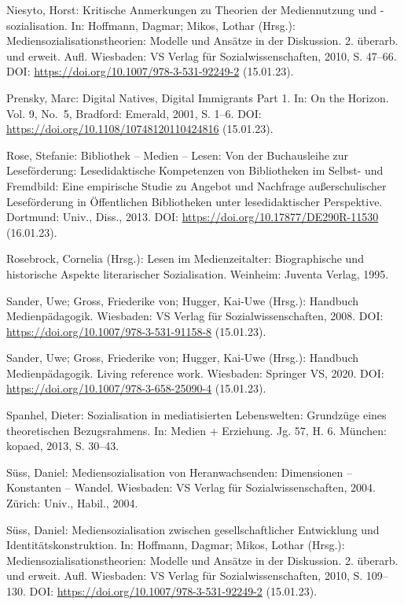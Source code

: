 \documentclass[a4paper,
fontsize=11pt,
oneside,
numbers=noperiodatend,
parskip=half-,
bibliography=totoc,
final
]{scrartcl}
\begin{document}
Niesyto, Horst: Kritische Anmerkungen zu Theorien der Mediennutzung und
-sozialisation. In: Hoffmann, Dagmar; Mikos, Lothar (Hrsg.):
Mediensozialisationstheorien: Modelle und Ansätze in der Diskussion. 2.
überarb. und erweit. Aufl. Wiesbaden: VS Verlag für
Sozialwissenschaften, 2010, S. 47--66. DOI:
\url{https://doi.org/10.1007/978-3-531-92249-2} (15.01.23).

Prensky, Marc: Digital Natives, Digital Immigrants Part 1. In: On the
Horizon. Vol. 9, No.~5, Bradford: Emerald, 2001, S. 1--6. DOI:
\url{https://doi.org/10.1108/10748120110424816} (15.01.23).

Rose, Stefanie: Bibliothek -- Medien -- Lesen: Von der Buchausleihe zur
Leseförderung: Lesedidaktische Kompetenzen von Bibliotheken im Selbst-
und Fremdbild: Eine empirische Studie zu Angebot und Nachfrage
außerschulischer Leseförderung in Öffentlichen Bibliotheken unter
lesedidaktischer Perspektive. Dortmund: Univ., Diss., 2013. DOI:
\url{https://doi.org/10.17877/DE290R-11530} (16.01.23).

Rosebrock, Cornelia (Hrsg.): Lesen im Medienzeitalter: Biographische und
historische Aspekte literarischer Sozialisation. Weinheim: Juventa
Verlag, 1995.

Sander, Uwe; Gross, Friederike von; Hugger, Kai-Uwe (Hrsg.): Handbuch
Medienpädagogik. Wiesbaden: VS Verlag für Sozialwissenschaften, 2008.
DOI: \url{https://doi.org/10.1007/978-3-531-91158-8} (15.01.23).

Sander, Uwe; Gross, Friederike von; Hugger, Kai-Uwe (Hrsg.): Handbuch
Medienpädagogik. Living reference work. Wiesbaden: Springer VS, 2020.
DOI: \url{https://doi.org/10.1007/978-3-658-25090-4} (15.01.23).

Spanhel, Dieter: Sozialisation in mediatisierten Lebenswelten: Grundzüge
eines theoretischen Bezugsrahmens. In: Medien + Erziehung. Jg. 57, H. 6.
München: kopaed, 2013, S. 30--43.

Süss, Daniel: Mediensozialisation von Heranwachsenden: Dimensionen --
Konstanten -- Wandel. Wiesbaden: VS Verlag für Sozialwissenschaften,
2004. Zürich: Univ., Habil., 2004.

Süss, Daniel: Mediensozialisation zwischen gesellschaftlicher
Entwicklung und Identitätskonstruktion. In: Hoffmann, Dagmar; Mikos,
Lothar (Hrsg.): Mediensozialisationstheorien: Modelle und Ansätze in der
Diskussion. 2. überarb. und erweit. Aufl. Wiesbaden: VS Verlag für
Sozialwissenschaften, 2010, S. 109--130. DOI:
\url{https://doi.org/10.1007/978-3-531-92249-2} (15.01.23).
\end{document}
